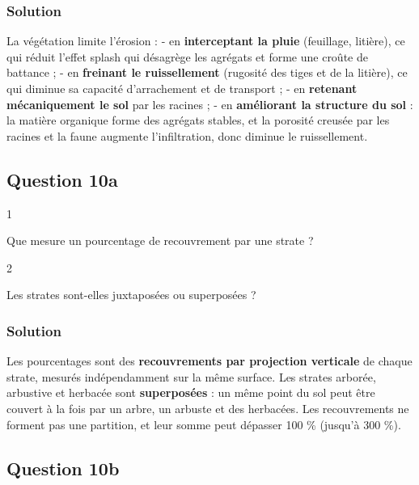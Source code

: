 \documentclass[11pt,a4paper]{article}
\begin{document}
\hypertarget{solution-26}{%
\subsubsection{Solution}\label{solution-26}}

La végétation limite l'érosion :
- en \textbf{interceptant la pluie} (feuillage, litière), ce qui réduit l'effet splash qui désagrège les agrégats et forme une croûte de battance ;
- en \textbf{freinant le ruissellement} (rugosité des tiges et de la litière), ce qui diminue sa capacité d'arrachement et de transport ;
- en \textbf{retenant mécaniquement le sol} par les racines ;
- en \textbf{améliorant la structure du sol} : la matière organique forme des agrégats stables, et la porosité creusée par les racines et la faune augmente l'infiltration, donc diminue le ruissellement.

\hypertarget{question-10a}{%
\subsection{Question 10a}\label{question-10a}}

\begin{indication}{1}

Que mesure un pourcentage de recouvrement par une strate ?

\end{indication}

\begin{indication}{2}

Les strates sont-elles juxtaposées ou superposées ?

\end{indication}

\hypertarget{solution-27}{%
\subsubsection{Solution}\label{solution-27}}

Les pourcentages sont des \textbf{recouvrements par projection verticale} de chaque strate, mesurés indépendamment sur la même surface. Les strates arborée, arbustive et herbacée sont \textbf{superposées} : un même point du sol peut être couvert à la fois par un arbre, un arbuste et des herbacées. Les recouvrements ne forment pas une partition, et leur somme peut dépasser 100 \% (jusqu'à 300 \%).

\hypertarget{question-10b}{%
\subsection{Question 10b}\label{question-10b}}
\end{document}
